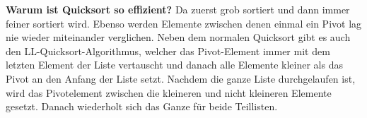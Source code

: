 \documentclass[12pt,a4paper]{article}
\begin{document}
\vspace*{0.7cm}
\newline
\textbf{Warum ist Quicksort so effizient?}\newline
Da zuerst grob sortiert und dann immer feiner sortiert wird. Ebenso werden Elemente zwischen denen einmal ein Pivot lag nie wieder miteinander verglichen. \newline
\newline
Neben dem normalen Quicksort gibt es auch den LL-Quicksort-Algorithmus, welcher das Pivot-Element immer mit dem letzten Element der Liste vertauscht und danach alle Elemente kleiner als das Pivot an den Anfang der Liste setzt. Nachdem die ganze Liste durchgelaufen ist, wird das Pivotelement zwischen die kleineren und nicht kleineren Elemente gesetzt. Danach wiederholt sich das Ganze für beide Teillisten.
\end{document}

